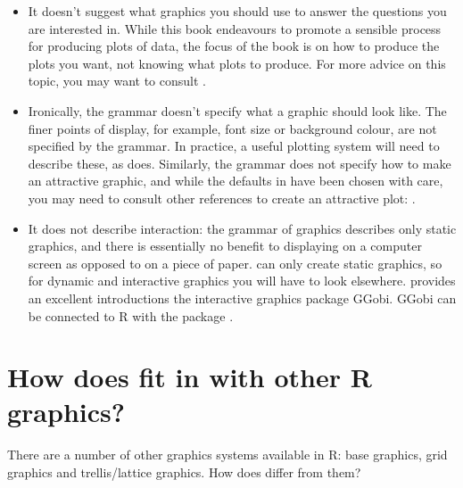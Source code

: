 \begin{itemize}
	\item It doesn't suggest what graphics you should use to answer the questions you are interested in.  While this book endeavours to promote a sensible process for producing plots of data, the focus of the book is on how to produce the plots you want, not knowing what plots to produce. For more advice on this topic, you may want to consult  \citet{robbins:2004,cleveland:1993,chambers:1983,tukey:1977}.

	\item Ironically, the grammar doesn't specify what a graphic should look like.  The finer points of display, for example, font size or background colour, are not specified by the grammar.  In practice, a useful plotting system will need to describe these, as \ggplot does. Similarly, the grammar does not specify how to make an attractive graphic, and while the defaults in \ggplot have been chosen with care, you may need to consult other references to create an attractive plot: \citet{tufte:1990,tufte:1997,tufte:2001,tufte:2006}.

	\item It does not describe interaction: the grammar of graphics describes only static graphics, and there is essentially no benefit to displaying on a computer screen as opposed to on a piece of paper.  \ggplot can only create static graphics, so for dynamic and interactive graphics you will have to look elsewhere.  \citet{cook:2007} provides an excellent introductions the interactive graphics package GGobi.  GGobi can be connected to R with the  package \citep{wickham:2007i}.

\end{itemize}

\section{How does \ggplot fit in with other R graphics?}

There are a number of other graphics systems available in R: base graphics, grid graphics and trellis/lattice graphics.  How does \ggplot differ from them?

